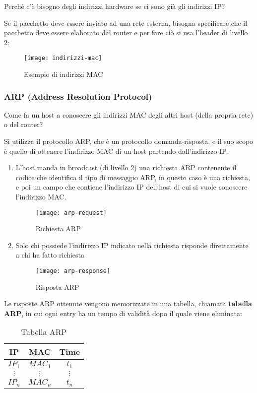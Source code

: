 \documentclass[a4paper]{article}
\begin{document}
\vspace{1em}
\noindent
Perchè c'è bisogno degli indirizzi hardware se ci sono già gli indirizzi IP?

Se il pacchetto deve essere inviato ad una rete esterna, bisogna specificare che
il pacchetto deve essere elaborato dal router e per fare ciò si usa l'header di
livello 2:
\begin{figure}[H]
  \centering
  \texttt{[image: indirizzi-mac]}
  \caption{Esempio di indirizzi MAC}
\end{figure}

\subsubsection{ARP (Address Resolution Protocol)}
Come fa un host a conoscere gli indirizzi MAC degli altri host (della propria rete)
o del router?

Si utilizza il protocollo ARP, che è un protocollo domanda-risposta, e il suo scopo
è quello di ottenere l'indirizzo MAC di un host partendo dall'indirizzo IP.
\begin{enumerate}
  \item L'host manda in broadcast (di livello 2) una richiesta ARP contenente
    il codice che identifica il tipo di messaggio ARP, in questo caso è una richiesta,
    e poi un campo che contiene l'indirizzo IP dell'host di cui si vuole conoscere
    l'indirizzo MAC.
    \begin{figure}[H]
      \centering
      \texttt{[image: arp-request]}
      \caption{Richiesta ARP}
    \end{figure}

  \item Solo chi possiede l'indirizzo IP indicato nella richiesta risponde direttamente
    a chi ha fatto richiesta
    \begin{figure}[H]
      \centering
      \texttt{[image: arp-response]}
      \caption{Risposta ARP}
    \end{figure}
\end{enumerate}
Le risposte ARP ottenute vengono memorizzate in una tabella, chiamata \textbf{tabella ARP},
in cui ogni entry ha un tempo di validità dopo il quale viene eliminata:
\begin{table}[H]
  \centering
  \begin{tabular}{|c|c|c|}
    \hline
    IP & MAC & Time \\
    \hline
    \( IP_1 \) & \( MAC_1 \) & \( t_1 \) \\
    \( \vdots \) & \( \vdots \) & \( \vdots \) \\
    \( IP_n \) & \( MAC_n \) & \( t_n \) \\
    \hline
  \end{tabular}
  \caption{Tabella ARP}
\end{table}
\end{document}
